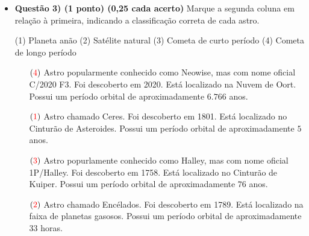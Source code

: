 \documentclass[a4paper, 12pt]{article}
\newcommand{\red}[1]{\textcolor{red}{#1}}
\begin{document}
\begin{flushleft}
\begin{itemize}
		\item \textbf{Questão 3) (1 ponto) (0,25 cada acerto)} Marque a segunda coluna em relação à primeira, indicando a classificação correta de cada astro.
			\begin{multicols}{2}
				\vfill\null \vfill\null
				\begin{flushleft}
					(1) Planeta anão \linebreak
					(2) Satélite natural \linebreak
					(3) Cometa de curto período \linebreak
					(4) Cometa de longo período
				\end{flushleft}
				\vfill\null \vfill\null
				\columnbreak
				\begin{itemize}
					\item[$(\red{4})$] Astro popularmente conhecido como Neowise, mas com nome oficial C/2020 F3. Foi descoberto em 2020. Está localizado na Nuvem de Oort. Possui um período orbital de aproximadamente $6.766$ anos.
					\item[$(\red{1})$] Astro chamado Ceres. Foi descoberto em 1801. Está localizado no Cinturão de Asteroides. Possui um período orbital de aproximadamente $5$ anos.
					\item[$(\red{3})$] Astro popurlamente conhecido como Halley, mas com nome oficial 1P/Halley. Foi descoberto em 1758. Está localizado no Cinturão de Kuiper. Possui um período orbital de aproximadamente $76$ anos.
					\item[$(\red{2})$] Astro chamado Encélados. Foi descoberto em 1789. Está localizado na faixa de planetas gasosos. Possui um período orbital de aproximadamente 33 horas.
				\end{itemize}
			\end{multicols}


\end{itemize}
\end{flushleft}
\end{document}
